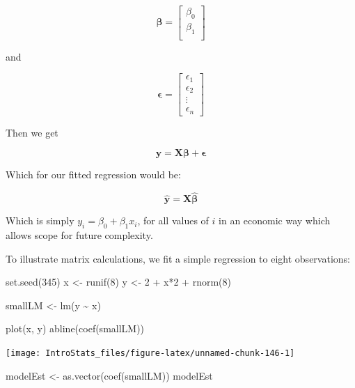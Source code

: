 \documentclass[
  oneside]{krantz}
\newenvironment{Shaded}{\begin{snugshade}}{\end{snugshade}}
\newcommand{\DecValTok}[1]{\textcolor[rgb]{0.00,0.00,0.81}{#1}}
\newcommand{\FunctionTok}[1]{\textcolor[rgb]{0.00,0.00,0.00}{#1}}
\newcommand{\NormalTok}[1]{#1}
\newcommand{\OtherTok}[1]{\textcolor[rgb]{0.56,0.35,0.01}{#1}}
\newcommand{\SpecialCharTok}[1]{\textcolor[rgb]{0.00,0.00,0.00}{#1}}
\begin{document}
\[
\mathbf{\beta} = 
\left[\begin{array}
{r}
\beta_0 \\
 \beta_1 \\  
\end{array}\right]
\]

and

\[
\mathbf{\epsilon} = 
\left[\begin{array}
{r}
\epsilon_1 \\
 \epsilon_2 \\  
\vdots \\
\epsilon_n
\end{array}\right]
\]

Then we get

\[ \mathbf{y} = \mathbf{X}\boldsymbol{\beta} + \mathbf{\epsilon}\]

Which for our fitted regression would be:

\[ \hat{\mathbf{y}} = \mathbf{X} \hat{\boldsymbol{\beta}} \]

Which is simply \(y_i = \beta_0 + \beta_1 x_i\), for all values of \(i\) in an economic way which allows scope for future complexity.

To illustrate matrix calculations, we fit a simple regression to eight observations:

\begin{Shaded}
\begin{Highlighting}[]
  \FunctionTok{set.seed}\NormalTok{(}\DecValTok{345}\NormalTok{)}
\NormalTok{  x }\OtherTok{\textless{}{-}} \FunctionTok{runif}\NormalTok{(}\DecValTok{8}\NormalTok{)}
\NormalTok{  y }\OtherTok{\textless{}{-}} \DecValTok{2} \SpecialCharTok{+}\NormalTok{ x}\SpecialCharTok{*}\DecValTok{2} \SpecialCharTok{+} \FunctionTok{rnorm}\NormalTok{(}\DecValTok{8}\NormalTok{)}
  
\NormalTok{  smallLM }\OtherTok{\textless{}{-}} \FunctionTok{lm}\NormalTok{(y }\SpecialCharTok{\textasciitilde{}}\NormalTok{ x)}

  \FunctionTok{plot}\NormalTok{(x, y)}
  \FunctionTok{abline}\NormalTok{(}\FunctionTok{coef}\NormalTok{(smallLM))}
\end{Highlighting}
\end{Shaded}

\begin{center}\texttt{[image: IntroStats\_files/figure-latex/unnamed-chunk-146-1]} \end{center}

\begin{Shaded}
\begin{Highlighting}[]
\NormalTok{  modelEst }\OtherTok{\textless{}{-}} \FunctionTok{as.vector}\NormalTok{(}\FunctionTok{coef}\NormalTok{(smallLM))}
\NormalTok{  modelEst}
\end{Highlighting}
\end{Shaded}
\end{document}
